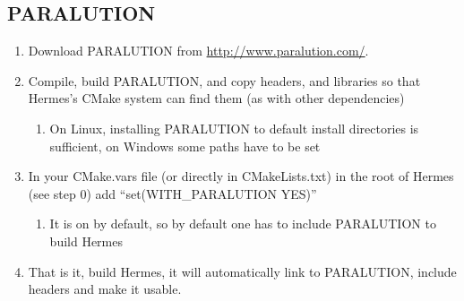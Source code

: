 \documentclass[a4paper,0pt,english]{sphinxmanual}
\begin{document}
\subsection{PARALUTION}
\label{src/installation/matrix_solvers/paralution:paralution}\label{src/installation/matrix_solvers/paralution::doc}\begin{enumerate}
\item {} 
Download PARALUTION from \href{http://www.paralution.com/}{http://www.paralution.com/}.

\item {} 
Compile, build PARALUTION, and copy headers, and libraries so that Hermes's CMake system can find them (as with other dependencies)
\begin{enumerate}
\item {} 
On Linux, installing PARALUTION to default install directories is sufficient, on Windows some paths have to be set

\end{enumerate}

\item {} 
In your CMake.vars file (or directly in CMakeLists.txt) in the root of Hermes (see step 0) add ``set(WITH\_PARALUTION YES)''
\begin{enumerate}
\item {} 
It is on by default, so by default one has to include PARALUTION to build Hermes

\end{enumerate}

\item {} 
That is it, build Hermes, it will automatically link to PARALUTION, include headers and make it usable.

\end{enumerate}
\end{document}
